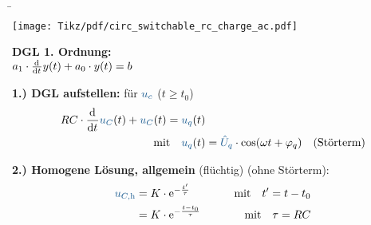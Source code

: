\b{%
\begin{frame}[t]%
    \begin{minipage}{\textwidth}\centering%
        \begin{minipage}[t][][t]{0.48\textwidth}\centering\vspace{0cm}%
            \texttt{[image: Tikz/pdf/circ\_switchable\_rc\_charge\_ac.pdf]}
        \end{minipage}%
        \begin{minipage}[t][][t]{0.48\textwidth}\centering\vspace{0cm}%
            \vspace{0.8cm}
            \textbf{DGL 1. Ordnung:}\\[0.85em]
            $a_1 \cdot \frac{\mathrm{d}^{{}}}{\mathrm{d}t^{{}}} y(t) + a_0 \cdot y(t)=b$\\
        \end{minipage}%
        \end{minipage}%

    \textbf{1.) DGL aufstellen:} für $\ecv{u_c}$ ($t \geq t_0$)\\[-1em]
    \begin{align*}
        RC \cdot \dt \ecv{u_C}(t) + \ecv{u_C}(t) ={}& \ecv{u_q}(t) \\
        \text{mit} \quad &\ecv{u_q}(t) = \ecv{\hat{U}_q} \cdot \cos(\omega t + \varphi_q)\quad\text{(Störterm)}
    \end{align*}

    \textbf{2.) Homogene Lösung, allgemein} (flüchtig) (ohne Störterm):
    \begin{align*}
        \ecv{u_{C,\mathrm{h}}} &= K \cdot \mathrm{e}^{-\frac{t'}{\tau}} \qquad &\text{mit} \quad t' = t-t_0 \\
        &= K \cdot \mathrm{e}^{-\frac{t-t_0}{\tau}} \qquad &\text{mit} \quad \tau = RC
    \end{align*}
\end{frame}

}
